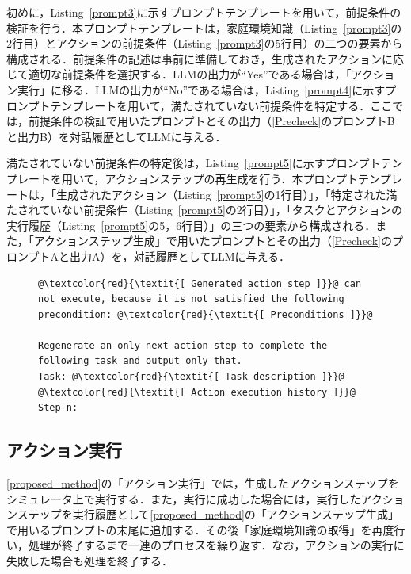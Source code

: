 初めに，Listing~\ref{prompt3}に示すプロンプトテンプレートを用いて，前提条件の検証を行う．本プロンプトテンプレートは，家庭環境知識（Listing~\ref{prompt3}の2行目）とアクションの前提条件（Listing~\ref{prompt3}の5行目）の二つの要素から構成される．前提条件の記述は事前に準備しておき，生成されたアクションに応じて適切な前提条件を選択する．LLMの出力が``Yes''である場合は，「アクション実行」に移る．LLMの出力が``No''である場合は，Listing~\ref{prompt4}に示すプロンプトテンプレートを用いて，満たされていない前提条件を特定する．ここでは，前提条件の検証で用いたプロンプトとその出力（\ref{Precheck}のプロンプトBと出力B）を対話履歴としてLLMに与える．

満たされていない前提条件の特定後は，Listing~\ref{prompt5}に示すプロンプトテンプレートを用いて，アクションステップの再生成を行う．本プロンプトテンプレートは，「生成されたアクション（Listing~\ref{prompt5}の1行目）」，「特定された満たされていない前提条件（Listing~\ref{prompt5}の2行目）」，「タスクとアクションの実行履歴（Listing~\ref{prompt5}の5，6行目）」の三つの要素から構成される．また，「アクションステップ生成」で用いたプロンプトとその出力（\ref{Precheck}のプロンプトAと出力A）を，対話履歴としてLLMに与える．

%


\begin{figure}[tb]
    \begin{lstlisting}[caption=\ref{Precheck}の「アクションステップ再生成」における「プロンプトD」の生成に用いるプロンプトテンプレート, label=prompt5]
@\textcolor{red}{\textit{[ Generated action step ]}}@ can not execute, because it is not satisfied the following 
precondition: @\textcolor{red}{\textit{[ Preconditions ]}}@

Regenerate an only next action step to complete the following task and output only that.
Task: @\textcolor{red}{\textit{[ Task description ]}}@
@\textcolor{red}{\textit{[ Action execution history ]}}@
Step n: 
    \end{lstlisting}
\end{figure}

\subsection{アクション実行} \label{sec4.5}
\ref{proposed_method}の「アクション実行」では，生成したアクションステップをシミュレータ上で実行する．また，実行に成功した場合には，実行したアクションステップを実行履歴として\ref{proposed_method}の「アクションステップ生成」で用いるプロンプトの末尾に追加する．その後「家庭環境知識の取得」を再度行い，処理が終了するまで一連のプロセスを繰り返す．なお，アクションの実行に失敗した場合も処理を終了する．


